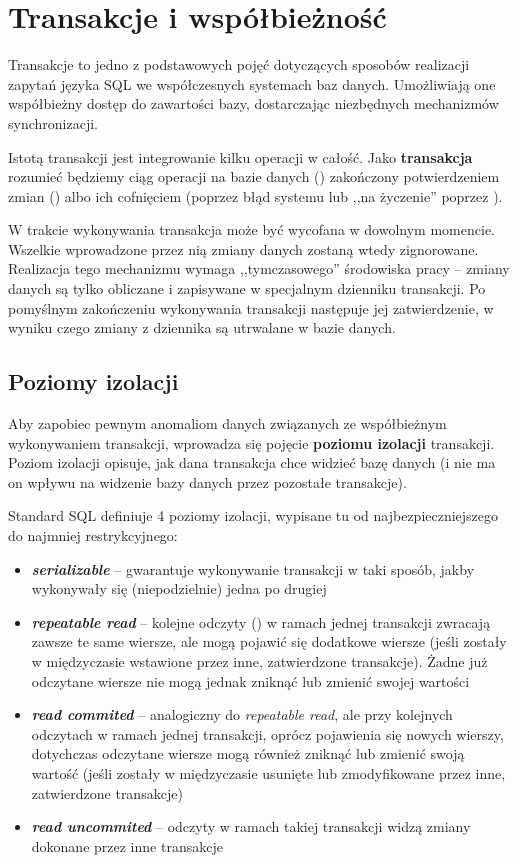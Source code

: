 \section{Transakcje i współbieżność}

Transakcje to jedno z podstawowych pojęć dotyczących sposobów realizacji zapytań języka SQL we współczesnych systemach baz danych. Umożliwiają one współbieżny dostęp do zawartości bazy, dostarczając niezbędnych mechanizmów synchronizacji.

Istotą transakcji jest integrowanie kilku operacji w  całość. Jako \textbf{transakcja} rozumieć będziemy ciąg operacji na bazie danych () zakończony potwierdzeniem zmian () albo ich cofnięciem (poprzez błąd systemu lub ,,na życzenie'' poprzez ).

W trakcie wykonywania transakcja może być wycofana w dowolnym momencie. Wszelkie wprowadzone przez nią zmiany danych zostaną wtedy zignorowane. Realizacja tego mechanizmu wymaga ,,tymczasowego'' środowiska pracy -- zmiany danych są tylko obliczane i zapisywane w specjalnym dzienniku transakcji. Po pomyślnym zakończeniu wykonywania transakcji następuje jej zatwierdzenie, w wyniku czego zmiany z dziennika są utrwalane w bazie danych.

\subsection{Poziomy izolacji}

Aby zapobiec pewnym anomaliom danych związanych ze współbieżnym wykonywaniem transakcji, wprowadza się pojęcie \textbf{poziomu izolacji} transakcji. Poziom izolacji opisuje, jak dana transakcja chce widzieć bazę danych (i nie ma on wpływu na widzenie bazy danych przez pozostałe transakcje).

Standard SQL definiuje 4 poziomy izolacji, wypisane tu od najbezpieczniejszego do najmniej restrykcyjnego:
\begin{itemize}
    \item \textbf{\textit{serializable}} -- gwarantuje wykonywanie transakcji w taki sposób, jakby wykonywały się  (niepodzielnie) jedna po drugiej
    \item \textbf{\textit{repeatable read}} -- kolejne odczyty () w ramach jednej transakcji zwracają zawsze te same wiersze, ale mogą pojawić się dodatkowe wiersze (jeśli zostały w międzyczasie wstawione przez inne, zatwierdzone transakcje). Żadne już odczytane wiersze nie mogą jednak zniknąć lub zmienić swojej wartości
    \item \textbf{\textit{read commited}} -- analogiczny do \textit{repeatable read}, ale przy kolejnych odczytach w ramach jednej transakcji, oprócz pojawienia się nowych wierszy, dotychczas odczytane wiersze mogą również zniknąć lub zmienić swoją wartość (jeśli zostały w międzyczasie usunięte lub zmodyfikowane przez inne, zatwierdzone transakcje)
    \item \textbf{\textit{read uncommited}} -- odczyty w ramach takiej transakcji widzą zmiany dokonane przez inne  transakcje
\end{itemize}

